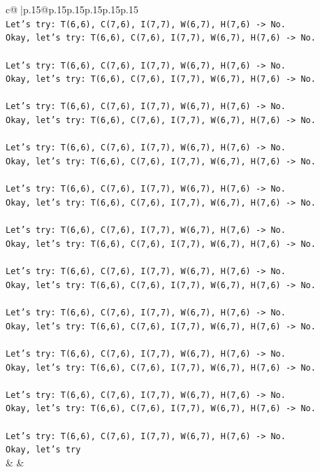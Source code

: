 \documentclass{article}
\begin{document}
{\begin{supertabular}{c@{$\;$}|p{.15\linewidth}@{}p{.15\linewidth}p{.15\linewidth}p{.15\linewidth}p{.15\linewidth}p{.15\linewidth}}
{{{\\ 
\texttt{Let's try: T(6,6), C(7,6), I(7,7), W(6,7), H(7,6) {-}> No.} \\
\texttt{Okay, let's try: T(6,6), C(7,6), I(7,7), W(6,7), H(7,6) {-}> No.} \\
\\ 
\texttt{Let's try: T(6,6), C(7,6), I(7,7), W(6,7), H(7,6) {-}> No.} \\
\texttt{Okay, let's try: T(6,6), C(7,6), I(7,7), W(6,7), H(7,6) {-}> No.} \\
\\ 
\texttt{Let's try: T(6,6), C(7,6), I(7,7), W(6,7), H(7,6) {-}> No.} \\
\texttt{Okay, let's try: T(6,6), C(7,6), I(7,7), W(6,7), H(7,6) {-}> No.} \\
\\ 
\texttt{Let's try: T(6,6), C(7,6), I(7,7), W(6,7), H(7,6) {-}> No.} \\
\texttt{Okay, let's try: T(6,6), C(7,6), I(7,7), W(6,7), H(7,6) {-}> No.} \\
\\ 
\texttt{Let's try: T(6,6), C(7,6), I(7,7), W(6,7), H(7,6) {-}> No.} \\
\texttt{Okay, let's try: T(6,6), C(7,6), I(7,7), W(6,7), H(7,6) {-}> No.} \\
\\ 
\texttt{Let's try: T(6,6), C(7,6), I(7,7), W(6,7), H(7,6) {-}> No.} \\
\texttt{Okay, let's try: T(6,6), C(7,6), I(7,7), W(6,7), H(7,6) {-}> No.} \\
\\ 
\texttt{Let's try: T(6,6), C(7,6), I(7,7), W(6,7), H(7,6) {-}> No.} \\
\texttt{Okay, let's try: T(6,6), C(7,6), I(7,7), W(6,7), H(7,6) {-}> No.} \\
\\ 
\texttt{Let's try: T(6,6), C(7,6), I(7,7), W(6,7), H(7,6) {-}> No.} \\
\texttt{Okay, let's try: T(6,6), C(7,6), I(7,7), W(6,7), H(7,6) {-}> No.} \\
\\ 
\texttt{Let's try: T(6,6), C(7,6), I(7,7), W(6,7), H(7,6) {-}> No.} \\
\texttt{Okay, let's try: T(6,6), C(7,6), I(7,7), W(6,7), H(7,6) {-}> No.} \\
\\ 
\texttt{Let's try: T(6,6), C(7,6), I(7,7), W(6,7), H(7,6) {-}> No.} \\
\texttt{Okay, let's try: T(6,6), C(7,6), I(7,7), W(6,7), H(7,6) {-}> No.} \\
\\ 
\texttt{Let's try: T(6,6), C(7,6), I(7,7), W(6,7), H(7,6) {-}> No.} \\
\texttt{Okay, let's try} \\
            }
        }
    }
    & & \\ \\


\end{supertabular}}
\end{document}
